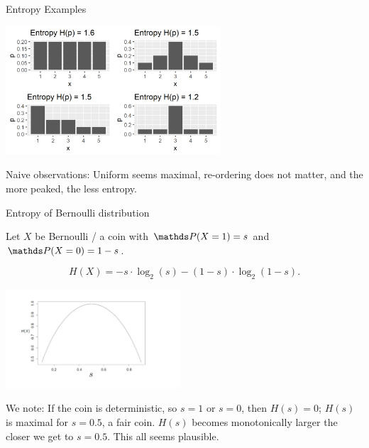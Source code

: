 \begin{vbframe}{Entropy Examples}
    
\begin{center}
\includegraphics[width = 8cm ]{figure/entropy_plot.png} \\
\end{center}

Naive observations: Uniform seems maximal, re-ordering does not matter, and the more peaked, the less entropy.
\end{vbframe}

\begin{vbframe}{Entropy of Bernoulli distribution}

Let $X$ be Bernoulli / a coin with $\P(X=1) = s$ and $\P(X=0) = 1 - s$.

$$ H(X)= -s \cdot \log_2(s)-(1-s)\cdot \log_2(1-s). $$

\begin{center}
\includegraphics[width = 6.5cm ]{figure_man/coin-entropy.png} \\
\end{center}

We note: If the coin is deterministic, so $s=1$ or $s=0$, then $H(s)=0$; 
$H(s)$ is maximal for $s = 0.5$, a fair coin. 
$H(s)$ becomes monotonically larger the closer we get to $s=0.5$.
This all seems plausible.

\end{vbframe}
  
